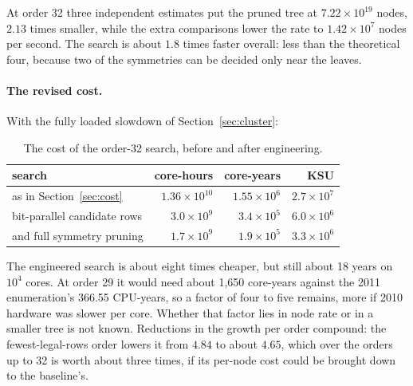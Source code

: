 \noindent At order 32 three independent estimates put the pruned tree at $7.22\times10^{19}$ nodes, $2.13$
times smaller, while the extra comparisons lower the rate to $1.42\times10^7$ nodes per second. The search is
about $1.8$ times faster overall: less than the theoretical four, because two of the symmetries can be
decided only near the leaves.

\paragraph{The revised cost.} With the fully loaded slowdown of Section~\ref{sec:cluster}:

\begin{table}[H]
\centering
\small
\begin{tabular}{@{}lrrr@{}}
\toprule
search & core-hours & core-years & KSU \\
\midrule
as in Section~\ref{sec:cost} & $1.36\times10^{10}$ & $1.55\times10^6$ & $2.7\times10^7$ \\
bit-parallel candidate rows & $3.0\times10^{9}$ & $3.4\times10^5$ & $6.0\times10^6$ \\
and full symmetry pruning & $1.7\times10^{9}$ & $1.9\times10^5$ & $3.3\times10^6$ \\
\bottomrule
\end{tabular}
\caption{The cost of the order-32 search, before and after engineering.}
\label{tab:revised}
\end{table}

\noindent The engineered search is about eight times cheaper, but still about 18 years on $10^4$ cores. At
order 29 it would need about 1{,}650 core-years against the 2011 enumeration's 366.55 CPU-years, so a factor
of four to five remains, more if 2010 hardware was slower per core. Whether that factor lies in node rate or
in a smaller tree is not known. Reductions in the growth per order compound: the fewest-legal-rows order
lowers it from $4.84$ to about $4.65$, which over the orders up to 32 is worth about three times, if its
per-node cost could be brought down to the baseline's.

